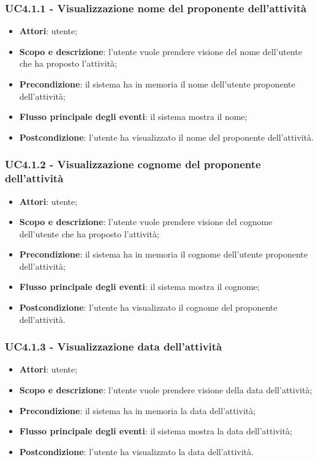 \subsubsection{UC4.1.1 - Visualizzazione nome del proponente dell’attività }
\begin{itemize}
\item \textbf{Attori}: utente;
\item \textbf{Scopo e descrizione}: l’utente vuole prendere visione del nome dell'utente che ha proposto l'attività;
\item \textbf{Precondizione}: il sistema ha in memoria il nome dell'utente proponente dell'attività;
\item \textbf{Flusso principale degli eventi}: il sistema mostra il nome;
\item \textbf{Postcondizione}: l’utente ha visualizzato il nome del proponente dell’attività.
\end{itemize}

\subsubsection{UC4.1.2 - Visualizzazione cognome del proponente dell’attività }
\begin{itemize}
	\item \textbf{Attori}: utente;
	\item \textbf{Scopo e descrizione}: l’utente vuole prendere visione del cognome dell'utente che ha proposto l'attività;
	\item \textbf{Precondizione}: il sistema ha in memoria il cognome dell'utente proponente dell'attività;
	\item \textbf{Flusso principale degli eventi}: il sistema mostra il cognome;
	\item \textbf{Postcondizione}: l’utente ha visualizzato il cognome del proponente dell’attività.
\end{itemize}

\subsubsection{UC4.1.3 - Visualizzazione data dell’attività }
\begin{itemize}
	\item \textbf{Attori}: utente;
	\item \textbf{Scopo e descrizione}: l’utente vuole prendere visione della data dell'attività;
	\item \textbf{Precondizione}: il sistema ha in memoria la data dell'attività;
	\item \textbf{Flusso principale degli eventi}: il sistema mostra la data dell'attività;
	\item \textbf{Postcondizione}: l’utente ha visualizzato la data dell'attività.
\end{itemize}

